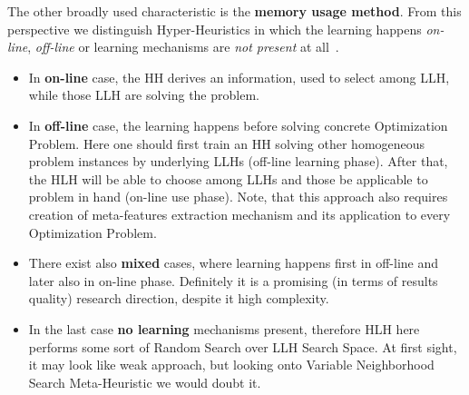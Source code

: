 The other broadly used characteristic is the \textbf{memory usage method}. 
From this perspective we distinguish Hyper-Heuristics in which the learning happens \textit{on-line}, \textit{off-line} or learning mechanisms are \textit{not present} at all~\cite{ryser2014review,burke2019classification}.
\begin{itemize}[itemsep=8pt]
	\item In \textbf{on-line} case, the HH derives an information, used to select among LLH, while those LLH are solving the problem.

	\item In \textbf{off-line} case, the learning happens before solving concrete Optimization Problem. Here one should first train an HH solving other homogeneous problem instances by underlying LLHs (off-line learning phase). After that, the HLH will be able to choose among LLHs and those be applicable to problem in hand (on-line use phase). Note, that this approach also requires creation of meta-features extraction mechanism and its application to every Optimization Problem.

	\item There exist also \textbf{mixed} cases, where learning happens first in off-line and later also in on-line phase. Definitely it is a promising (in terms of results quality) research direction, despite it high complexity.
	
	\item In the last case \textbf{no learning} mechanisms present, therefore HLH here performs some sort of Random Search over LLH Search Space. At first sight, it may look like weak approach, but looking onto Variable Neighborhood Search Meta-Heuristic we would doubt it.
\end{itemize}



